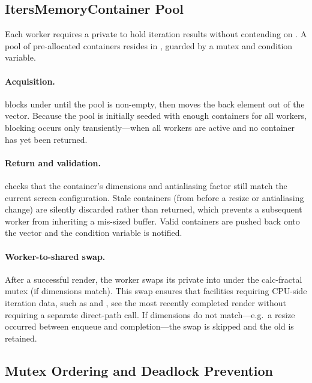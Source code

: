 \subsection{ItersMemoryContainer Pool}
\label{subsec:iters-pool}

Each worker requires a private  to hold
iteration results without contending on .  A pool
of pre-allocated containers resides in
, guarded by a mutex and
condition variable.

\paragraph{Acquisition.}
 blocks under
 until the pool is non-empty, then
moves the back element out of the vector.  Because the pool is
initially seeded with enough containers for all workers, blocking
occurs only transiently---when all workers are active and no
container has yet been returned.

\paragraph{Return and validation.}
 checks that the container's dimensions and
antialiasing factor still match the current screen configuration.
Stale containers (from before a resize or antialiasing change) are
silently discarded rather than returned, which prevents a subsequent
worker from inheriting a mis-sized buffer.  Valid containers are
pushed back onto the vector and the condition variable is notified.

\paragraph{Worker-to-shared swap.}
After a successful render, the worker swaps its private
 into  under the
calc-fractal mutex (if dimensions match).  This swap ensures that
facilities requiring CPU-side iteration data, such as
 and , see
the most recently completed render without requiring a separate direct-path
call.  If dimensions do not match---e.g.\ a resize occurred between
enqueue and completion---the swap is skipped and the old
 is retained.

\subsection{Mutex Ordering and Deadlock Prevention}
\label{subsec:mutex-ordering}

